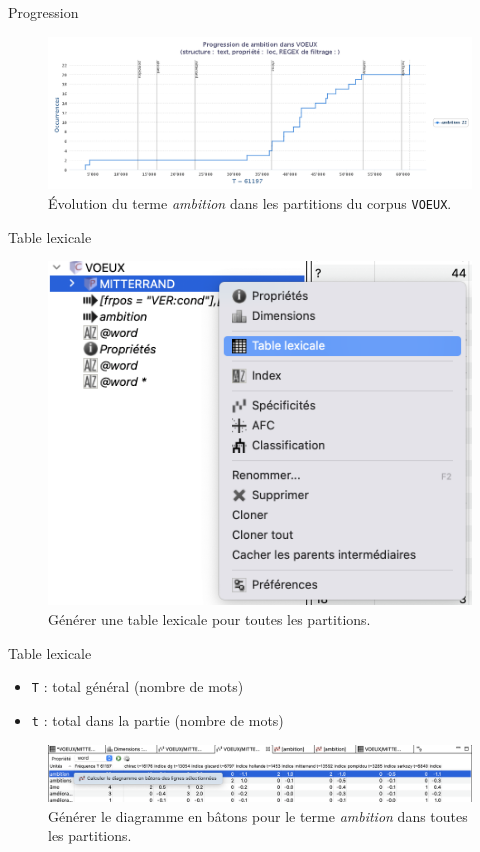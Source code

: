 \documentclass[xetex,xcolor={table,usenames,dvipsnames}]{beamer}
\begin{document}
\begin{frame}{Progression}
	\begin{figure}[h] %
		\centering
		\includegraphics[width=1\linewidth]{img/ambition.png}
		\caption{Évolution du terme \textit{ambition} dans les partitions du corpus \texttt{VOEUX}.}
		\label{fig:ling_out_TAL}
	\end{figure}
\end{frame}

\begin{frame}{Table lexicale}
		\begin{figure}[h] %
		\centering
		\includegraphics[width=.7\linewidth]{img/table_lexicale.png}
		\caption{Générer une table lexicale pour toutes les partitions.}
		\label{fig:ling_out_TAL}
	\end{figure}
\end{frame}

\begin{frame}{Table lexicale}
	\begin{itemize}
		\item \texttt{T} : total général (nombre de mots)
		\item \texttt{t} : total dans la partie (nombre de mots)
	\end{itemize}
	 
	\begin{figure}[h] %
		\centering
		\includegraphics[width=1\linewidth]{img/diagramme_batons.png}
		\caption{Générer le diagramme en bâtons pour le terme \textit{ambition} dans toutes les partitions.}
		\label{fig:ling_out_TAL}
	\end{figure}
\end{frame}
\end{document}
